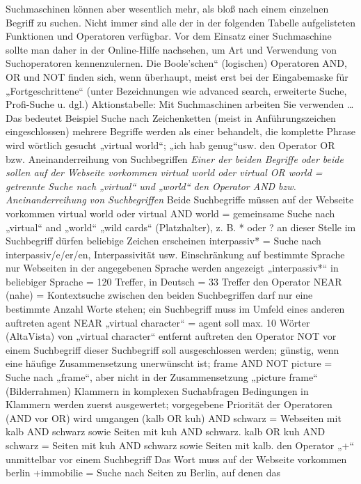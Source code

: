 \documentclass[]{book}
\theoremstyle{definition}
\theoremstyle{definition}
\theoremstyle{definition}
\theoremstyle{remark}
\begin{document}
Suchmaschinen können aber wesentlich mehr, als bloß nach einem einzelnen
Begriff zu suchen. Nicht immer sind alle der in der folgenden Tabelle
aufgelisteten Funktionen und Operatoren verfügbar. Vor dem Einsatz einer
Suchmaschine sollte man daher in der Online-Hilfe nachsehen, um Art und
Verwendung von Suchoperatoren kennenzulernen. Die Boole'schen``
(logischen) Operatoren AND, OR und NOT finden sich, wenn überhaupt,
meist erst bei der Eingabemaske für „Fortgeschrittene`` (unter
Bezeichnungen wie advanced search, erweiterte Suche, Profi-Suche u.
dgl.) Aktionstabelle: Mit Suchmaschinen arbeiten Sie verwenden \ldots{}
Das bedeutet Beispiel Suche nach Zeichenketten (meist in
Anführungszeichen eingeschlossen) mehrere Begriffe werden als einer
behandelt, die komplette Phrase wird wörtlich gesucht „virtual world``;
„ich hab genug``usw. den Operator OR bzw. Aneinanderreihung von
Suchbegriffen\emph{ Einer der beiden Begriffe oder beide sollen auf der
Webseite vorkommen virtual world oder virtual OR world = getrennte Suche
nach „virtual`` und „world`` den Operator AND bzw. Aneinanderreihung von
Suchbegriffen} Beide Suchbegriffe müssen auf der Webseite vorkommen
virtual world oder virtual AND world = gemeinsame Suche nach „virtual``
and „world`` „wild cards`` (Platzhalter), z. B. * oder ? an dieser
Stelle im Suchbegriff dürfen beliebige Zeichen erscheinen interpassiv* =
Suche nach interpassiv/e/er/en, Interpassivität usw. Einschränkung auf
bestimmte Sprache nur Webseiten in der angegebenen Sprache werden
angezeigt „interpassiv*`` in beliebiger Sprache = 120 Treffer, in
Deutsch = 33 Treffer den Operator NEAR (nahe) = Kontextsuche zwischen
den beiden Suchbegriffen darf nur eine bestimmte Anzahl Worte stehen;
ein Suchbegriff muss im Umfeld eines anderen auftreten agent NEAR
„virtual character`` = agent soll max. 10 Wörter (AltaVista) von
„virtual character`` entfernt auftreten den Operator NOT vor einem
Suchbegriff dieser Suchbegriff soll ausgeschlossen werden; günstig, wenn
eine häufige Zusammensetzung unerwünscht ist; frame AND NOT picture =
Suche nach „frame``, aber nicht in der Zusammensetzung „picture frame``
(Bilderrahmen) Klammern in komplexen Suchabfragen Bedingungen in
Klammern werden zuerst ausgewertet; vorgegebene Priorität der Operatoren
(AND vor OR) wird umgangen (kalb OR kuh) AND schwarz = Webseiten mit
kalb AND schwarz sowie Seiten mit kuh AND schwarz. kalb OR kuh AND
schwarz = Seiten mit kuh AND schwarz sowie Seiten mit kalb. den Operator
„+`` unmittelbar vor einem Suchbegriff Das Wort muss auf der Webseite
vorkommen berlin +immobilie = Suche nach Seiten zu Berlin, auf denen das
\end{document}

